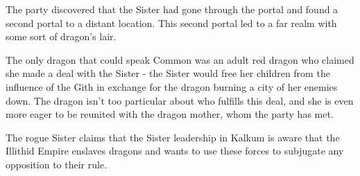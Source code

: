 The party discovered that the Sister had gone through the portal and found a second portal to a distant location.
This second portal led to a far realm with some sort of dragon's lair.

The only dragon that could speak Common was an adult red dragon who claimed she made a deal with the Sister - the Sister would free her children from the influence of the Gith in exchange for the dragon burning a city of her enemies down.
The dragon isn't too particular about who fulfills this deal, and she is even more eager to be reunited with the dragon mother, whom the party has met.

The rogue Sister claims that the Sister leadership in Kalkum is aware that the Illithid Empire enslaves dragons and wants to use these forces to subjugate any opposition to their rule.